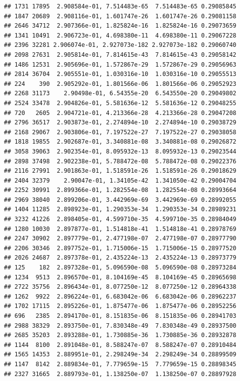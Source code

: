\documentclass[
]{article}
\begin{document}
\begin{verbatim}
## 1731 17895  2.908584e-01, 7.514483e-65  7.514483e-65 0.29085845
## 1847 20689  2.908116e-01, 1.601747e-26  1.601747e-26 0.29081158
## 2646 34712  2.907366e-01, 1.825824e-16  1.825824e-16 0.29073659
## 1341 10491  2.906723e-01, 4.698380e-11  4.698380e-11 0.29067228
## 2396 32281 2.906074e-01, 2.927073e-182 2.927073e-182 0.29060740
## 2098 27631  2.905814e-01, 7.814615e-43  7.814615e-43 0.29058142
## 1486 12531  2.905696e-01, 1.572867e-29  1.572867e-29 0.29056963
## 2814 36704  2.905551e-01, 1.030316e-10  1.030316e-10 0.29055513
## 224    390  2.905292e-01, 1.801566e-06  1.801566e-06 0.29052923
## 2268 31173    2.90498e-01, 6.54355e-20  6.543550e-20 0.29049802
## 2524 33478  2.904826e-01, 5.581636e-12  5.581636e-12 0.29048255
## 720   2605  2.904721e-01, 4.213366e-28  4.213366e-28 0.29047208
## 2796 36517  2.903873e-01, 2.274894e-10  2.274894e-10 0.29038729
## 2168 29067  2.903806e-01, 7.197522e-27  7.197522e-27 0.29038058
## 1818 19855  2.902687e-01, 3.340881e-08  3.340881e-08 0.29026872
## 3058 39063  2.902354e-01, 8.095932e-13  8.095932e-13 0.29023544
## 2898 37498  2.902238e-01, 5.788472e-08  5.788472e-08 0.29022376
## 2116 27991  2.901863e-01, 1.518591e-26  1.518591e-26 0.29018629
## 2404 32379    2.90047e-01, 1.34105e-42  1.341050e-42 0.29004704
## 2252 30991  2.899366e-01, 1.282554e-08  1.282554e-08 0.28993664
## 2969 38040  2.899206e-01, 3.442969e-69  3.442969e-69 0.28992055
## 1404 11285  2.898923e-01, 1.290353e-34  1.290353e-34 0.28989231
## 3232 41226  2.898405e-01, 4.599710e-35  4.599710e-35 0.28984049
## 1280 10030  2.897877e-01, 1.514818e-41  1.514818e-41 0.28978769
## 2247 30902  2.897779e-01, 2.477198e-07  2.477198e-07 0.28977790
## 2206 30346  2.897752e-01, 1.715006e-15  1.715006e-15 0.28977520
## 2026 24687  2.897378e-01, 2.435224e-13  2.435224e-13 0.28973779
## 125    182  2.897328e-01, 5.096590e-08  5.096590e-08 0.28973284
## 1234  9513  2.896570e-01, 8.104169e-45  8.104169e-45 0.28965698
## 2722 35756  2.896434e-01, 8.077250e-12  8.077250e-12 0.28964338
## 1262  9922  2.896224e-01, 6.683042e-06  6.683042e-06 0.28962237
## 1702 17115  2.895226e-01, 1.875477e-06  1.875477e-06 0.28952256
## 696   2385  2.894170e-01, 8.151835e-06  8.151835e-06 0.28941703
## 2988 38329  2.893750e-01, 7.830348e-49  7.830348e-49 0.28937500
## 2685 35203  2.893288e-01, 1.730885e-36  1.730885e-36 0.28932878
## 1144  8100  2.891048e-01, 8.588247e-07  8.588247e-07 0.28910484
## 1565 14353  2.889951e-01, 2.298249e-34  2.298249e-34 0.28899509
## 1147  8142  2.889834e-01, 7.779659e-15  7.779659e-15 0.28898345
## 2327 31665  2.889793e-01, 1.138250e-07  1.138250e-07 0.28897928

\end{verbatim}
\end{document}
